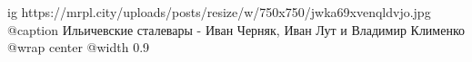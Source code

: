  
 
 
 
 

\ifcmt
  ig https://mrpl.city/uploads/posts/resize/w/750x750/jwka69xvenqldvjo.jpg
	@caption Ильичевские сталевары - Иван Черняк, Иван Лут и Владимир Клименко
  @wrap center
  @width 0.9
\fi
